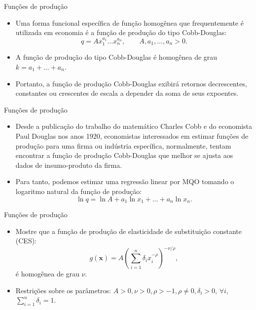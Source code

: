 \documentclass[10pt]{beamer}
\begin{document}
\begin{frame}{Funções de produção}
    \begin{itemize}
        \item Uma forma funcional específica de função homogênea que frequentemente é utilizada em economia é a função de produção do tipo Cobb-Douglas:
        \[
        q = Ax_1^{a_1} \dots x_n^{a_n}, \qquad A, a_1, \dots, a_n > 0.
        \]
         
        \item A função de produção do tipo Cobb-Douglas é homogênea de grau $k = a_1 + \dots + a_n$.
        \bigskip
        \item Portanto, a função de produção Cobb-Douglas exibirá retornos decrescentes, constantes ou crescentes de escala a depender da soma de seus expoentes.
    \end{itemize}
\end{frame}

\begin{frame}{Funções de produção}
    \begin{itemize}
       \item Desde a publicação do trabalho do matemático Charles Cobb e do economista Paul Douglas nos anos 1920, economistas interessados em estimar funções de produção para uma firma ou indústria específica, normalmente, tentam encontrar a função de produção Cobb-Douglas que melhor se ajusta aos dados de insumo-produto da firma.
       \bigskip
       \item Para tanto, podemos estimar uma regressão linear por MQO tomando o logaritmo natural da função de produção:
       \[
       \ln q = \ln A + a_1 \ln x_1 + \dots + a_n \ln x_n.
       \]
    \end{itemize}
\end{frame}

\begin{frame}{Funções de produção}
    \begin{itemize}
        \item Mostre que a função de produção de elasticidade de substituição constante (CES):
        \[
            g(\mathbf{x}) = A\left(\sum_{i=1}^n \delta_i x_i^{-\rho}\right)^{-\nu/\rho},
        \]
        é homogênea de grau $\nu$.
        \bigskip
        \item Restrições sobre os parâmetros: $A>0, \nu>0, \rho>-1, \rho \neq 0, \delta_i>0$, $\forall i$, $\sum_{i=1}^n \delta_i = 1$.
    \end{itemize}
\end{frame}
\end{document}
